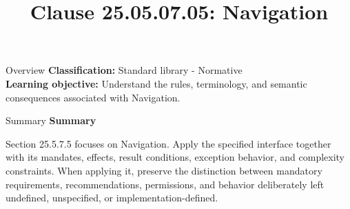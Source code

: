 \documentclass[10pt,letterpaper]{article}
\title{Clause 25.05.07.05: Navigation}
\author{}
\date{}
\begin{document}
\maketitle
\begin{CornellOverviewBox}{Overview}
\textbf{Classification:} Standard library - Normative\\[2pt]
\textbf{Learning objective:} Understand the rules, terminology, and semantic consequences associated with Navigation.
\end{CornellOverviewBox}\begin{CornellSummaryBox}{Summary}
{\sffamily\bfseries\color{Accent} Summary}\par\vspace{3pt}Section 25.5.7.5 focuses on Navigation. Apply the specified interface together with its mandates, effects, result conditions, exception behavior, and complexity constraints. When applying it, preserve the distinction between mandatory requirements, recommendations, permissions, and behavior deliberately left undefined, unspecified, or implementation-defined.
\end{CornellSummaryBox}
\end{document}
